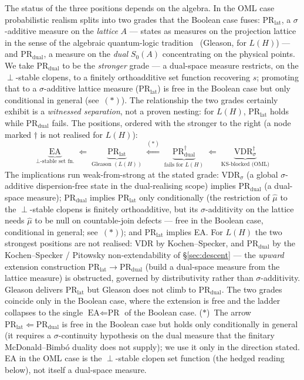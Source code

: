 The status of the three positions depends on the algebra.  In the OML
case probabilistic realism splits into two grades that the Boolean case
fuses: $\text{PR}_{\text{lat}}$, a $\sigma$-additive measure on the
\emph{lattice} $A$ --- states as measures on the projection lattice in
the sense of the algebraic quantum-logic
tradition~\cite{Redei1998} (Gleason, for $L(H)$) --- and
$\text{PR}_{\text{dual}}$,
a measure on the \emph{dual} $S_0(A)$ concentrating on the physical
points.  We take $\text{PR}_{\text{dual}}$ to be the \emph{stronger}
grade --- a dual-space measure restricts, on the $\perp$-stable clopens,
to a finitely orthoadditive set function recovering $s$; promoting that
to a $\sigma$-additive lattice measure ($\text{PR}_{\text{lat}}$) is free
in the Boolean case but only conditional in general (see~$(\ast)$).  The
relationship the two grades certainly exhibit is a \emph{witnessed
separation}, not a proven nesting: for $L(H)$, $\text{PR}_{\text{lat}}$
holds while $\text{PR}_{\text{dual}}$ fails.  The positions, ordered with
the stronger to the right (a node marked $\dagger$ is not realised for
$L(H)$):
\[
  \underbrace{\text{EA}}_{\text{$\perp$-stable set fn.}}
  \;\Longleftarrow\;
  \underbrace{\text{PR}_{\text{lat}}}_{\text{Gleason }(L(H))}
  \;\overset{(\ast)}{\Longleftarrow}\;
  \underbrace{\text{PR}_{\text{dual}}^{\dagger}}_{\text{fails for }L(H)}
  \;\Longleftarrow\;
  \underbrace{\text{VDR}_{\sigma}^{\dagger}}_{\text{KS-blocked (OML)}}
\]
The implications run weak-from-strong at the stated grade:
$\mathrm{VDR}_{\sigma}$ (a global $\sigma$-additive dispersion-free state in
the dual-realising scope) implies $\text{PR}_{\text{dual}}$ (a dual-space measure);
$\text{PR}_{\text{dual}}$ implies $\text{PR}_{\text{lat}}$ only
conditionally (the restriction of $\hat\mu$ to the $\perp$-stable clopens
is finitely orthoadditive, but its $\sigma$-additivity on the lattice
needs $\hat\mu$ to be null on countable-join defects --- free in the
Boolean case, conditional in general; see~$(\ast)$); and
$\text{PR}_{\text{lat}}$ implies EA.  For
$L(H)$ the two strongest positions are not realised: VDR by
Kochen--Specker, and $\text{PR}_{\text{dual}}$ by the
Kochen--Specker / Pitowsky non-extendability of \S\ref{sec:descent}
--- the \emph{upward} extension construction
$\text{PR}_{\text{lat}} \to \text{PR}_{\text{dual}}$ (build a dual-space
measure from the lattice measure) is obstructed, governed by
distributivity rather than $\sigma$-additivity.  Gleason delivers
$\text{PR}_{\text{lat}}$ but Gleason does not climb to
$\text{PR}_{\text{dual}}$.  The two grades coincide only in the Boolean
case, where the extension is free and the ladder collapses to the single
$\text{EA} \Leftarrow \text{PR}$ of the Boolean case.  ($\ast$)~The arrow
$\text{PR}_{\text{lat}} \Leftarrow \text{PR}_{\text{dual}}$ is free in
the Boolean case but holds only conditionally in general (it requires a
$\sigma$-continuity hypothesis on the dual measure that the finitary
McDonald--Bimb\'{o} duality does not supply); we use it only in the
direction stated.  EA in the OML case is the $\perp$-stable clopen set
function (the hedged reading below), not itself a dual-space measure.

